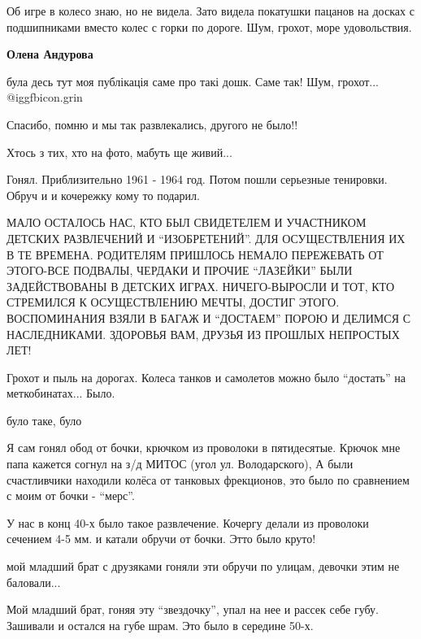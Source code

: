 \begin{itemize}
Об игре в колесо знаю, но не видела. Зато видела покатушки пацанов на досках с
подшипниками вместо колес с горки по дороге. Шум, грохот, море удовольствия.

\textbf{Олена Андурова} 

була десь тут моя публікація саме про такі дошк. Саме так! Шум, грохот...
@igg{fbicon.grin} 


Спасибо, помню и мы так развлекались, другого не было!!

Хтось з тих, хто на фото, мабуть ще живий...


Гонял. Приблизительно 1961 - 1964 год. Потом пошли серьезные тенировки. Обруч и
и кочережку кому то подарил.


МАЛО ОСТАЛОСЬ НАС, КТО БЫЛ СВИДЕТЕЛЕМ И УЧАСТНИКОМ ДЕТСКИХ РАЗВЛЕЧЕНИЙ И
\enquote{ИЗОБРЕТЕНИЙ}. ДЛЯ ОСУЩЕСТВЛЕНИЯ ИХ В ТЕ ВРЕМЕНА. РОДИТЕЛЯМ ПРИШЛОСЬ
НЕМАЛО ПЕРЕЖЕВАТЬ ОТ ЭТОГО-ВСЕ ПОДВАЛЫ, ЧЕРДАКИ И ПРОЧИЕ \enquote{ЛАЗЕЙКИ} БЫЛИ
ЗАДЕЙСТВОВАНЫ В ДЕТСКИХ ИГРАХ. НИЧЕГО-ВЫРОСЛИ И ТОТ, КТО СТРЕМИЛСЯ К
ОСУЩЕСТВЛЕНИЮ МЕЧТЫ, ДОСТИГ ЭТОГО. ВОСПОМИНАНИЯ ВЗЯЛИ В БАГАЖ И
\enquote{ДОСТАЕМ} ПОРОЮ И ДЕЛИМСЯ С НАСЛЕДНИКАМИ. ЗДОРОВЬЯ ВАМ, ДРУЗЬЯ ИЗ
ПРОШЛЫХ НЕПРОСТЫХ ЛЕТ!

Грохот и пыль на дорогах. Колеса танков и самолетов можно было \enquote{достать} на меткобинатах... Было.

було таке, було


Я сам гонял обод от бочки, крючком из проволоки в пятидесятые. Крючок мне папа
кажется согнул на з/д МИТОС (угол ул. Володарского), А были счастливчики находили
колёса от танковых фрекционов, это было по сравнением с моим от бочки - \enquote{мерс}.


У нас в конц 40-х было такое развлечение. Кочергу делали из проволоки сечением
4-5 мм. и катали обручи от бочки. Этто было круто!


мой младший брат с друзяками гоняли эти обручи по улицам, девочки этим не баловали...


Мой младший брат, гоняя эту \enquote{звездочку}, упал на нее и рассек себе
губу. Зашивали и остался на губе шрам. Это было в середине 50-х.



\end{itemize}
